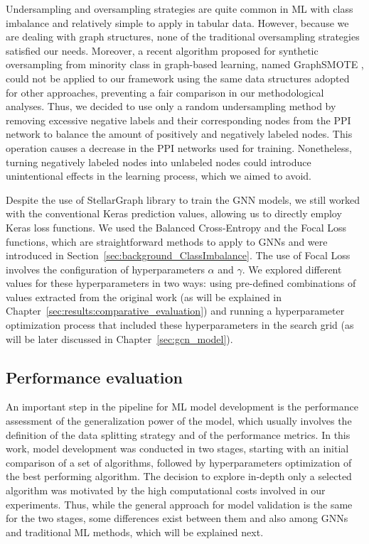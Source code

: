 Undersampling and oversampling strategies are quite common in ML with class imbalance and relatively simple to apply in tabular data. However, because we are dealing with graph structures, none of the traditional oversampling strategies satisfied our needs. Moreover, a recent algorithm proposed for synthetic oversampling from minority class in graph-based learning, named GraphSMOTE \cite{zhao2021graphsmote}, could not be applied to our framework using the same data structures adopted for other approaches, preventing a fair comparison in our methodological analyses. Thus, we decided to use only a random undersampling method by removing excessive negative labels and their corresponding nodes from the PPI network to balance the amount of positively and negatively labeled nodes. This operation causes a decrease in the PPI networks used for training. Nonetheless, turning negatively labeled nodes into unlabeled nodes could introduce unintentional effects in the learning process, which we aimed to avoid. 


Despite the use of StellarGraph library to train the GNN models, we still worked with the conventional Keras prediction values, allowing us to directly employ Keras loss functions. We used the Balanced Cross-Entropy and the Focal Loss functions, which are straightforward methods to apply to GNNs and were introduced in Section~\ref{sec:background_ClassImbalance}. The use of Focal Loss involves the configuration of hyperparameters $\alpha$ and $\gamma$. We explored different values for these hyperparameters in two ways: using pre-defined combinations of values extracted from the original work (as will be explained in Chapter~\ref{sec:results:comparative_evaluation}) and running a hyperparameter optimization process that included these hyperparameters in the search grid (as will be later discussed in Chapter~\ref{sec:gcn_model}).







\subsection{Performance evaluation} 
\label{sec:model_training}

An important step in the pipeline for ML model development is the performance assessment of the generalization power of the model, which usually involves the definition of the data splitting strategy and of the performance metrics. In this work, model development was conducted in two stages, starting with %
an initial comparison of a set of algorithms, followed by hyperparameters optimization of the best performing algorithm. The decision to explore in-depth only a selected algorithm was motivated by the high computational costs involved in our experiments. Thus, while the general approach for model validation is the same for the two stages, some differences exist between them and also among GNNs and traditional ML methods, which will be explained next.

